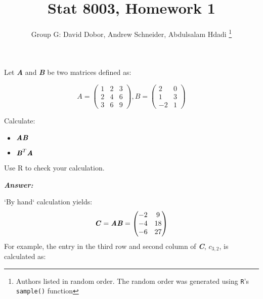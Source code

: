 \documentclass[12pt]{article}
\newcommand{\blditA}{\textbf{\textit{A}}}
\newcommand{\blditB}{\textbf{\textit{B}}}
\newcommand{\blditC}{\textbf{\textit{C}}}
\newenvironment{question}[2][Question]{\begin{trivlist}
\item[\hskip \labelsep {\bfseries #1}\hskip \labelsep {\bfseries #2.}]}{\end{trivlist}}
\begin{document}
 

 
\title{Stat 8003, Homework 1}%
\author{Group G: David Dobor, Andrew Schneider,  Abdulsalam Hdadi 
\footnote{Authors listed in random order. The random order was generated using \texttt{R}'s \texttt{sample()} function}
\\ %
} %
 
\maketitle
 
 
\begin{question}{1.1} %
Let \blditA $ $ and \blditB $ $ be two matrices defined as:

\begin{equation*}
A = \begin{pmatrix}
  1 & 2 & 3\\
  2 & 4 & 6\\
  3 & 6 & 9
\end{pmatrix},
B = \begin{pmatrix}
  2 & 0\\
  1 & 3\\
 -2 & 1
\end{pmatrix}
\end{equation*}

Calculate:

\begin{itemize}
  \item $\blditA \blditB$
  \item $\blditB^T \blditA $
\end{itemize}

Use R to check your calculation.

 \end{question}
 
 
 \textbf{\emph{Answer:} }
 
`By hand` calculation yields:
\begin{equation*}
\blditC  = \blditA \blditB = 
\begin{pmatrix}
  -2 & 9\\
  -4 & 18\\
  -6 & 27
\end{pmatrix}
\end{equation*}
 For example, the entry in the third row and second column of \blditC, $c_{3,2}$, is calculated as:
 
\end{document}
